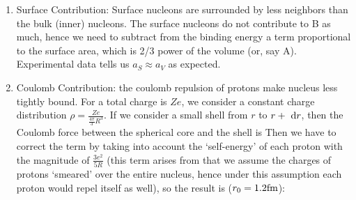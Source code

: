 \documentclass{school-22.101-notes}
\begin{document}
\begin{enumerate}
\begin{enumerate}
    \item Surface Contribution: Surface nucleons are surrounded by less neighbors than the bulk (inner) nucleons. The surface nucleons do not contribute to B as much, hence we need to subtract from the binding energy a term proportional to the surface area, which is 2/3 power of the volume (or, say A). Experimental data tells us $a_S \approx a_V$ as expected. 

    \item Coulomb Contribution: the coulomb repulsion of protons make nucleus less tightly bound. For a total charge is $Ze$, we consider a constant charge distribution $\rho = \frac{Ze}{\frac{4\pi}{3} R^3}.$ If we consider a small shell from $r$ to $r + \mbox{ }\mathrm{d} r$, then the Coulomb force between the spherical core and the shell is 
    Then we have to correct the term by taking into account the `self-energy' of each proton with the magnitude of $\frac{3e^2}{5R}$ (this term arises from that we assume the charges of protons `smeared' over the entire nucleus, hence under this assumption each proton would repel itself as well), so the result is ($r_0 = 1.2 \mathrm{fm}$):


\end{enumerate}
\end{enumerate}
\end{document}
